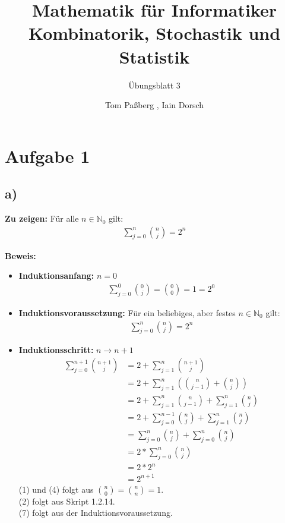 \documentclass[a4paper]{scrartcl}
\title{Mathematik für Informatiker \\ Kombinatorik, Stochastik und Statistik}
\subtitle{Übungsblatt 3}
\author{Tom Paßberg , Iain Dorsch}
\date{}
\begin{document}
\maketitle

\newpage
\section*{Aufgabe 1}
\subsection*{a)}
\textbf{Zu zeigen:} Für alle $ n \in \mathbb{N}_0$ gilt: 
\begin{align*}
    \sum_{j=0}^{n} \binom{n}{j} = 2^n
\end{align*}

\textbf{Beweis:} 
\begin{itemize}
    \item \textbf{Induktionsanfang:} $n = 0$
    \begin{align*}
        \sum_{j=0}^{0} \binom{0}{j} = \binom{0}{0} = 1 = 2^0
    \end{align*}
    \item \textbf{Induktionsvoraussetzung:} Für ein beliebiges, aber festes $n \in \mathbb{N}_0$ gilt:
    \begin{align*}
        \sum_{j=0}^{n} \binom{n}{j} = 2^n
    \end{align*}
    \item \textbf{Induktionsschritt:} $n \to n+1$
    \begin{align}
        \sum_{j=0}^{n+1} \binom{n+1}{j} &= 2 + \sum_{j=1}^{n} \binom{n+1}{j} \\ 
        &= 2 + \sum_{j=1}^{n} \left( \binom{n}{j-1} + \binom{n}{j} \right) \\
        &= 2 + \sum_{j=1}^{n} \binom{n}{j-1} + \sum_{j=1}^{n}\binom{n}{j} \\
        &= 2 + \sum_{j=0}^{n-1} \binom{n}{j} + \sum_{j=1}^{n} \binom{n}{j} \\
        &= \sum_{j=0}^{n} \binom{n}{j} + \sum_{j=0}^{n} \binom{n}{j} \\
        &= 2 * \sum_{j=0}^{n} \binom{n}{j} \\
        &= 2 * 2^n \\[8px]
        &= 2^{n+1}
    \end{align}
    (1) und (4) folgt aus $ \binom{n}{0} = \binom{n}{n} = 1$. \\
    (2) folgt aus Skript 1.2.14. \\
    (7) folgt aus der Induktionsvoraussetzung. 
\end{itemize}
\end{document}
